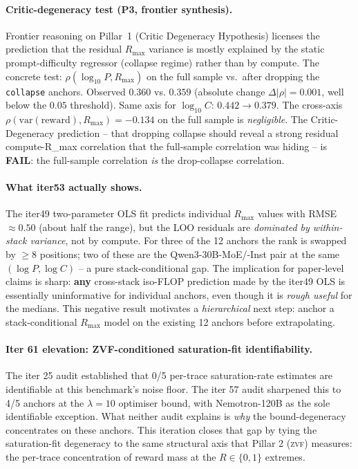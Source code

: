 \documentclass{article}
\begin{document}
\paragraph{Critic-degeneracy test (P3, frontier synthesis).}
Frontier reasoning on Pillar~1 (Critic Degeneracy Hypothesis) licenses
the prediction that the residual $R_{\max}$ variance is mostly explained
by the static prompt-difficulty regressor (collapse regime) rather than
by compute. The concrete test: $\rho(\log_{10} P, R_{\max})$ on the full
sample vs.\ after dropping the \texttt{collapse} anchors. Observed
$0.360$ vs. $0.359$ (absolute change $\Delta|\rho|=0.001$, well below the
$0.05$ threshold). Same axis for $\log_{10} C$: $0.442 \to 0.379$. The
cross-axis $\rho(\mathrm{var}(\mathrm{reward}), R_{\max})=-0.134$ on the full
sample is \emph{negligible}. The Critic-Degeneracy prediction -- that
dropping collapse should reveal a strong residual compute-R_max
correlation that the full-sample correlation was hiding -- is
\textbf{FAIL}: the full-sample correlation \emph{is} the drop-collapse
correlation.

\paragraph{What iter53 actually shows.}
The iter49 two-parameter OLS fit predicts individual $R_{\max}$ values with
RMSE $\approx 0.50$ (about half the range), but the LOO residuals are
\emph{dominated by within-stack variance}, not by compute. For three of
the 12 anchors the rank is swapped by $\geq 8$ positions; two of these are
the Qwen3-30B-MoE/-Inst pair at the same $(\log P, \log C)$ -- a pure
stack-conditional gap. The implication for paper-level claims is sharp:
\textbf{any} cross-stack iso-FLOP prediction made by the iter49 OLS is
essentially uninformative for individual anchors, even though it is
\emph{rough useful} for the medians. This negative result motivates a
\emph{hierarchical} next step: anchor a stack-conditional $R_{\max}$
model on the existing 12 anchors before extrapolating.
 \paragraph{Iter 61 elevation: ZVF-conditioned saturation-fit identifiability.}
\label{par:scaling-iter61}
The iter 25 audit established that 0/5 per-trace saturation-rate
estimates are identifiable at this benchmark's noise floor.  The
iter 57 audit sharpened this to 4/5 anchors at the \(\lambda = 10\)
optimiser bound, with Nemotron-120B as the sole identifiable
exception.  What neither audit explains is \emph{why} the
bound-degeneracy concentrates on these anchors.  This iteration
closes that gap by tying the saturation-fit degeneracy to the same
structural axis that Pillar 2 (\textsc{zvf}) measures: the
per-trace concentration of reward mass at the \(R \in \{0, 1\}\)
extremes.
\end{document}
